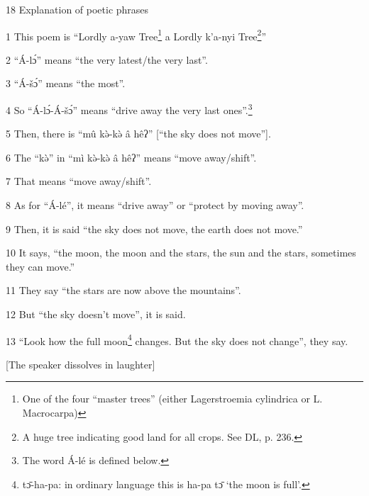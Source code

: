 
18 Explanation of poetic phrases

1 This poem is ``Lordly a-yaw Tree\footnote{One of the four ``master trees'' (either Lagerstroemia cylindrica or L. Macrocarpa)} a Lordly k'a-nyi Tree\.\footnote{A huge tree indicating good land for all crops. See DL, p. 236.}''

2 ``Á-lɔ́'' means ``the very latest/the very last''.

3 ``Á-šɔ́'' means ``the most''.

4 So ``Á-lɔ́-Á-šɔ́'' means ``drive away the very last ones''.\footnote{The word Á-lé is defined below.}

5 Then, there is ``mû kə̀-kə̀ â hêʔ'' [``the sky does not move''].

6 The ``kə̀'' in ``mì kə̀-kə̀ â hêʔ'' means ``move away/shift''.

7 That means ``move away/shift''.

8 As for ``Á-lé'', it means ``drive away'' or ``protect by moving away''.

9 Then, it is said ``the sky does not move, the earth does not move.''

10 It says, ``the moon, the moon and the stars, the sun and the stars, sometimes
they can move.''

11 They say ``the stars are now above the mountains''.

12 But ``the sky doesn't move'', it is said.

13 ``Look how the full moon\footnote{tɔ̄-ha-pa: in ordinary language this is ha-pa tɔ̄ `the moon is full'.} changes. But the sky does not change'', they say.

[The speaker dissolves in laughter]

